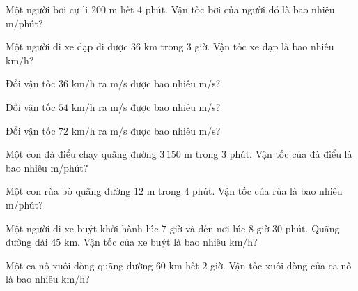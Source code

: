 \begin{ex}
  Một người bơi cự li $200\text{ m}$ hết $4$ phút. Vận tốc bơi của người đó là bao nhiêu m/phút?
\end{ex}

\begin{ex}
  Một người đi xe đạp đi được $36\text{ km}$ trong $3$ giờ. Vận tốc xe đạp là bao nhiêu km/h?
\end{ex}

\begin{ex}
  Đổi vận tốc $36\text{ km/h}$ ra m/s được bao nhiêu m/s?
\end{ex}

\begin{ex}
  Đổi vận tốc $54\text{ km/h}$ ra m/s được bao nhiêu m/s?
\end{ex}

\begin{ex}
  Đổi vận tốc $72\text{ km/h}$ ra m/s được bao nhiêu m/s?
\end{ex}

\begin{ex}
  Một con đà điểu chạy quãng đường $3\,150\text{ m}$ trong $3$ phút. Vận tốc của đà điểu là bao nhiêu m/phút?
\end{ex}

\begin{ex}
  Một con rùa bò quãng đường $12\text{ m}$ trong $4$ phút. Vận tốc của rùa là bao nhiêu m/phút?
\end{ex}

\begin{ex}
  Một người đi xe buýt khởi hành lúc $7\text{ giờ}$ và đến nơi lúc $8\text{ giờ } 30\text{ phút}$. Quãng đường dài $45\text{ km}$. Vận tốc của xe buýt là bao nhiêu km/h?
\end{ex}

\begin{ex}
  Một ca nô xuôi dòng quãng đường $60\text{ km}$ hết $2$ giờ. Vận tốc xuôi dòng của ca nô là bao nhiêu km/h?
\end{ex}

